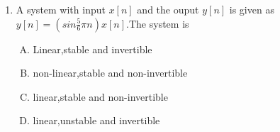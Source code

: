 \documentclass[journal,12pt,twocolumn]{IEEEtran}
\begin{document}
\begin{enumerate}
\item A system with input $x[n]$ and the ouput $y[n]$ is given as $y[n]=(sin\frac{5}{6}\pi n)x[n]$.The system is
\begin{enumerate}[(A)]

\setlength\itemsep{1em}


\item Linear,stable and invertible
\item non-linear,stable and non-invertible
\item linear,stable and non-invertible
\item linear,unstable and invertible


\end{enumerate}








%
%
%

%
%
%
%
%


%
%
%


\end{enumerate}
\end{document}
